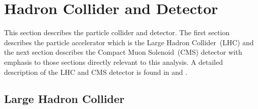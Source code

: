\chapter{Hadron Collider and Detector}
This section describes the particle collider and detector. The first section describes the particle accelerator which is the Large Hadron Collider~(LHC) and the next section describes the Compact Muon Solenoid~(CMS) detector with emphasis to those sections directly relevant to this analysis. A detailed description of the LHC and CMS detector is found in \cite{LHC} and \cite{CMSTDR}.
\section{Large Hadron Collider}

